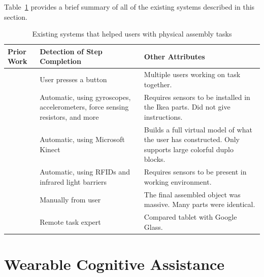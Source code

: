 Table~\ref{table:prior_work} provides a brief summary of all of the existing
systems described in this section.

\begin{table}
  \begin{tabular}{| l | p{2in} | p{2.5in} |}
    \hline
    Prior Work & Detection of Step Completion & Other Attributes\\
    \hline
    \citet{webuild} & User presses a button & Multiple users working on task
                                              together.\\
    \hline
    \citet{sensors} & Automatic, using gyroscopes, accelerometers, force sensing
                      resistors, and more & Requires sensors to be installed in
                                            the Ikea parts. Did not give
                                            instructions.\\
    \hline
    \citet{kinect} & Automatic, using Microsoft Kinect & Builds a full virtual
                                                         model of what the user
                                                         has constructed. Only
                                                         supports large colorful
                                                         duplo blocks. \\
    \hline
    \citet{smartwatch} & Automatic, using RFIDs and infrared light barriers
                                              & Requires sensors to be present
                                                in working environment.\\
    \hline
    \citet{robotic_arm} & Manually from user
                                              & The final assembled object was
                                                massive. Many parts were
                                                identical.\\
    \hline
    \citet{collaboration} & Remote task expert
                                              & Compared tablet with Google
                                                Glass.\\
    \hline
\end{tabular}
\caption{
  Existing systems that helped users with physical assembly tasks
}\label{table:prior_work}
\end{table}

\section{Wearable Cognitive Assistance}

